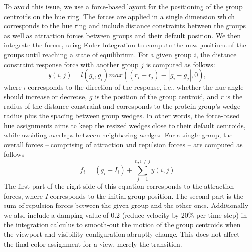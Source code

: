 \documentclass{egpubl}
\begin{document}
	To avoid this issue, we use a force-based layout for the positioning of the group centroids on the hue ring.
	The forces are applied in a single dimension which corresponds to the hue ring and include distance constraints between the groups as well as attraction forces between groups and their default position.
	We then integrate the forces, using Euler Integration to compute the new positions of the groups until reaching a state of equilibrium.
	For a given group $i$, the distance constraint response force with another group $j$ is computed as follows:
	\begin{equation}%
	y(i, j) = l(g_{i},g_{j})max((r_{i}+r_{j}) - |g_{i} - g_{j}|, 0), 
	\end{equation}%
	where $l$ corresponds to the direction of the response, i.e., whether the hue angle should increase or decrease, $g$ is the position of the group centroid, and $r$ is the radius of the distance constraint and corresponds to the protein group's wedge radius plus the spacing between group wedges. 
	In other words, the force-based hue assignments aims to keep the resized wedges close to their default centroids, while avoiding overlaps between neighboring wedges.  
	For a single group, the overall forces -- comprising of attraction and repulsion forces -- are computed as follows:
	\begin{equation}
	f_{i} = (g_{i} - I_{i}) + \sum_{j=1}^{n, i \neq j} y(i,j)
	\end{equation}
	The first part of the right side of this equation corresponds to the attraction forces, where $I$ corresponds to the initial group position.
	The second part is the sum of repulsion forces between the given group and the other ones.
    Additionally we also include a damping value of 0.2 (reduce velocity by 20\% per time step) in the integration calculus to smooth-out the motion of the group centroids when the viewport and visibility configuration abruptly change. This does not affect the final color assignment for a view, merely the transition.
	
\end{document}
